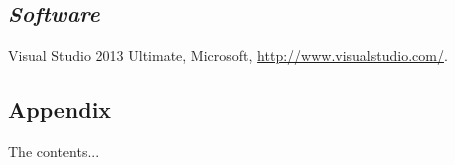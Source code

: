 \documentclass[12pt]{article}
\begin{document}
\subsection{\it{Software}}
\begin{description}
\item Visual Studio 2013 Ultimate, Microsoft, \url{http://www.visualstudio.com/}.
\end{description}

\newpage

\begin{appendices}
\section{Appendix}
The contents...
\end{appendices}
\end{document}
